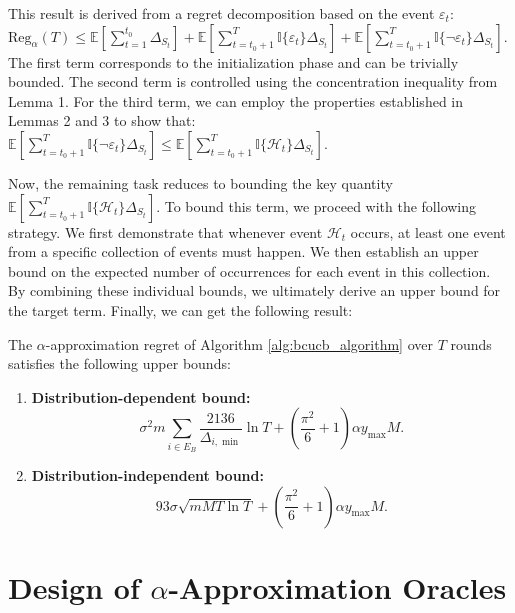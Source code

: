 \documentclass[opre,sglanonrev]{informs4}
\begin{document}
This result is derived from a regret decomposition based on the event \(\varepsilon_t\):
$
\text{Reg}_{\alpha}(T) \leq \mathbb{E}\left[\sum_{t=1}^{t_0} \Delta_{S_t}\right] + \mathbb{E}\left[\sum_{t=t_0+1}^{T} \mathbb{I}\{\varepsilon_t\} \Delta_{S_t}\right] + \mathbb{E}\left[\sum_{t=t_0+1}^{T} \mathbb{I}\{\neg \varepsilon_t\} \Delta_{S_t}\right]
$. The first term corresponds to the initialization phase and can be trivially bounded. The second term is controlled using the concentration inequality from Lemma 1. For the third term, we can employ the properties established in Lemmas 2 and 3 to show that:
$
\mathbb{E}\left[\sum_{t=t_0+1}^{T} \mathbb{I}\{\neg \varepsilon_t\} \Delta_{S_t}\right] \leq \mathbb{E}\left[\sum_{t=t_0+1}^{T} \mathbb{I}\{\mathcal{H}_t\} \Delta_{S_t}\right].
$ 

Now, the remaining task reduces to bounding the key quantity \(\mathbb{E}\left[\sum_{t=t_0+1}^{T} \mathbb{I}\{\mathcal{H}_t\} \Delta_{S_t}\right]\). To bound this term, we proceed with the following strategy. We first demonstrate that whenever event \(\mathcal{H}_t\) occurs, at least one event from a specific collection of events must happen. We then establish an upper bound on the expected number of occurrences for each event in this collection. By combining these individual bounds, we ultimately derive an upper bound for the target term. Finally, we can get the following result:

\begin{theorem}
\label{thm:regret_bound}
The $\alpha$-approximation regret of Algorithm \ref{alg:bcucb_algorithm} over $T$ rounds satisfies the following upper bounds:
\begin{enumerate}
    \item \textbf{Distribution-dependent bound:}
    $$
    \sigma^2 m \sum_{i \in E_B} \frac{2136}{\Delta_{i,\min}} \ln T + \left(\frac{\pi^2}{6} + 1\right) \alpha y_{\text{max}} M.
    $$
    
    \item \textbf{Distribution-independent bound:}
    $$
    93\sigma \sqrt{m M T \ln T} + \left(\frac{\pi^2}{6} + 1\right) \alpha y_{\text{max}} M.
    $$
\end{enumerate}
\end{theorem}


\section{Design of $\alpha$-Approximation Oracles}
\label{oracle}
\end{document}
